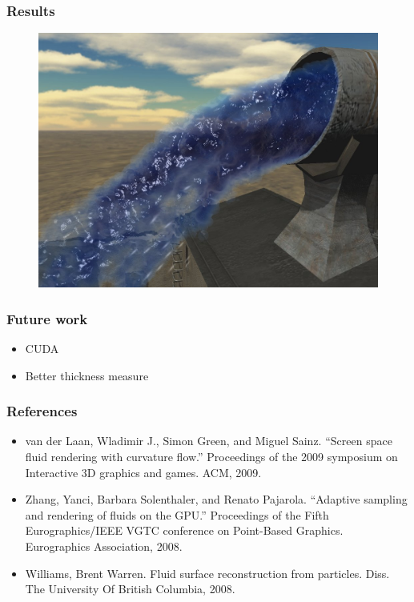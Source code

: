 \documentclass{beamer}
\begin{document}
	\begin{frame}[t]\frametitle{Results}
		\begin{figure}
			\centering
		    \includegraphics[width=.8\textwidth]{curveFlow.png}
		\end{figure}
	\end{frame}
	\begin{frame}[t]\frametitle{Future work}
	    \begin{itemize}
	    	\item CUDA
	    	\item Better thickness measure
	    \end{itemize}
	\end{frame}
	\begin{frame}[t]\frametitle{References}
	    \begin{itemize}
	    	\item van der Laan, Wladimir J., Simon Green, and Miguel Sainz. ``Screen space fluid rendering with curvature flow.'' Proceedings of the 2009 symposium on Interactive 3D graphics and games. ACM, 2009.
	    	\item Zhang, Yanci, Barbara Solenthaler, and Renato Pajarola. ``Adaptive sampling and rendering of fluids on the GPU.'' Proceedings of the Fifth Eurographics/IEEE VGTC conference on Point-Based Graphics. Eurographics Association, 2008.
	    	\item Williams, Brent Warren. Fluid surface reconstruction from particles. Diss. The University Of British Columbia, 2008.
	    \end{itemize}
	\end{frame}
\end{document}
